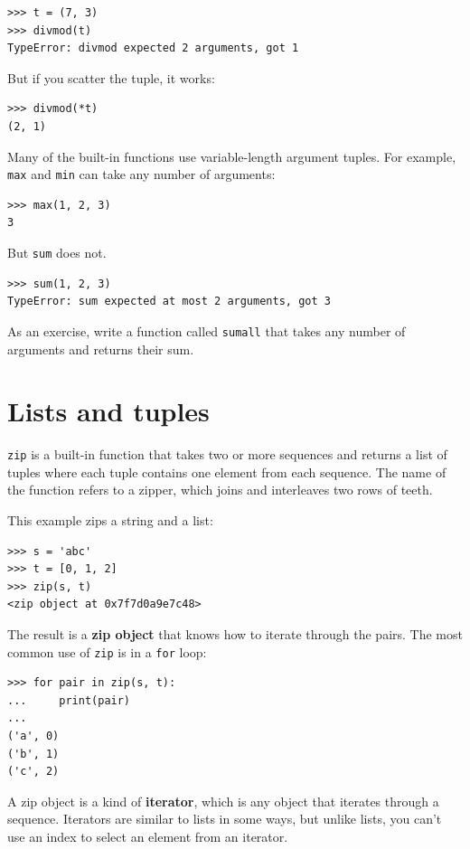 \documentclass[10pt]{book}
\begin{document}
\begin{verbatim}
>>> t = (7, 3)
>>> divmod(t)
TypeError: divmod expected 2 arguments, got 1
\end{verbatim}
%
But if you scatter the tuple, it works:

\begin{verbatim}
>>> divmod(*t)
(2, 1)
\end{verbatim}
%
Many of the built-in functions use
variable-length argument tuples.  For example, {\tt max}
and {\tt min} can take any number of arguments:

\begin{verbatim}
>>> max(1, 2, 3)
3
\end{verbatim}
%
But {\tt sum} does not.

\begin{verbatim}
>>> sum(1, 2, 3)
TypeError: sum expected at most 2 arguments, got 3
\end{verbatim}
%
As an exercise, write a function called {\tt sumall} that takes any number
of arguments and returns their sum.


\section{Lists and tuples}

{\tt zip} is a built-in function that takes two or more sequences and
returns a list of tuples where each tuple contains one
element from each sequence.  The name of the function refers to
a zipper, which joins and interleaves two rows of teeth.

This example zips a string and a list:

\begin{verbatim}
>>> s = 'abc'
>>> t = [0, 1, 2]
>>> zip(s, t)
<zip object at 0x7f7d0a9e7c48>
\end{verbatim}
%
The result is a {\bf zip object} that knows how to iterate through
the pairs.  The most common use of {\tt zip} is in a {\tt for} loop:

\begin{verbatim}
>>> for pair in zip(s, t):
...     print(pair)
...
('a', 0)
('b', 1)
('c', 2)
\end{verbatim}
%
A zip object is a kind of {\bf iterator}, which is any object
that iterates through a sequence.  Iterators are similar to lists in some
ways, but unlike lists, you can't use an index to select an element from
an iterator.
\end{document}

